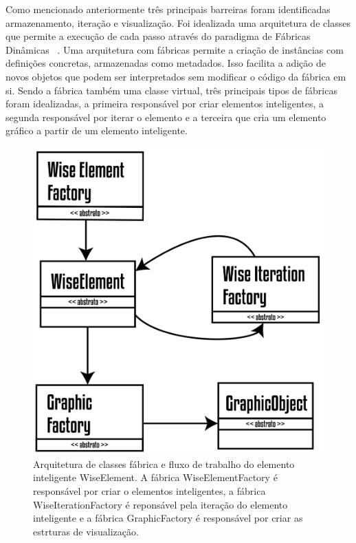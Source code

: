 \documentclass[a4paper,12pt]{monografia}
\theoremstyle{plain}
\theoremstyle{definition}
\theoremstyle{remark}
\begin{document}
Como mencionado anteriormente três principais barreiras foram identificadas armazenamento, iteração e visualização. Foi idealizada uma arquitetura de classes que permite a execução de cada passo através do paradigma de Fábricas Dinâmicas~ \cite{factorypattern}. Uma arquitetura com fábricas permite a criação de instâncias com definições concretas, armazenadas como metadados. Isso facilita a adição de novos objetos que podem ser interpretados sem modificar o código da fábrica em si. Sendo a fábrica também uma classe virtual, três principais tipos de fábricas foram idealizadas, a primeira responsável por criar elementos inteligentes, a  segunda responsável por iterar o elemento e a terceira que cria um elemento gráfico a partir de um elemento inteligente.

\begin{figure}[!htbp]
	\centering
	\includegraphics[width=\textwidth]{Figures/WiseElementWorkflow@16x.png}
	\caption{Arquitetura de classes fábrica e fluxo de trabalho do elemento inteligente WiseElement. A fábrica WiseElementFactory é responsável por criar o elementos inteligentes, a fábrica WiseIterationFactory é reponsável pela iteração do elemento inteligente e a fábrica GraphicFactory é responsável por criar as estrturas de visualização. }
	\label{fig2:wiselementsworkflow}
\end{figure}
\end{document}
